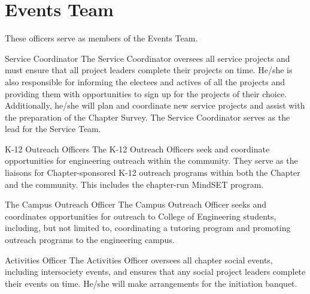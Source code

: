 \section{Events Team}
These officers serve as members of the Events Team.
\begin{enumsubsection}
\item{Service Coordinator} The Service Coordinator oversees all service projects and must ensure that all project leaders complete their projects on time. He/she is also responsible for informing the electees and actives of all the projects and providing them with opportunities to sign up for the projects of their choice. Additionally, he/she will plan and coordinate new service projects and assist with the preparation of the Chapter Survey. The Service Coordinator serves as the lead for the Service Team.
\item{ K-12 Outreach Officers} The K-12 Outreach Officers seek and coordinate opportunities for engineering outreach within the community.  They serve as the liaisons for Chapter-sponsored K-12 outreach programs within both the Chapter and the community. This includes the chapter-run MindSET program. 

\item{The Campus Outreach Officer} The Campus Outreach Officer seeks and coordinates opportunities for outreach to College of Engineering students, including, but not limited to, coordinating a tutoring program and promoting outreach programs to the engineering campus. 

\item{Activities Officer} The Activities Officer oversees all chapter social events, including intersociety events, and ensures that any social project leaders complete their events on time. He/she will make arrangements for the initiation banquet. 
\end{enumsubsection}
